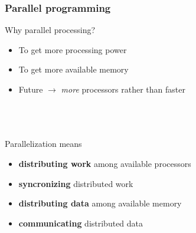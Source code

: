 \documentclass[mathserif, 10pt]{beamer}
\begin{document}
\begin{frame}
    \frametitle{Parallel programming}
    Why parallel processing?
    \begin{itemize}
	\item	To get more processing power
	\item	To get more available memory
	\item	Future $\rightarrow$ \emph{more} processors rather than faster
    \end{itemize}
    \ \\
    \ \\
    \ \\
    \pause
    Parallelization means
    \begin{itemize}
	\item	\textbf{distributing work} among available processors
	\item	\textbf{syncronizing} distributed work
	\item	\textbf{distributing data} among available memory
	\item	\textbf{communicating} distributed data
    \end{itemize}
\end{frame}
\end{document}
